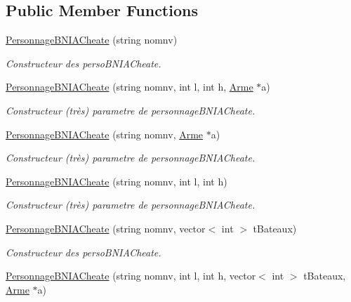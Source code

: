 \subsection*{Public Member Functions}
\begin{DoxyCompactItemize}
\item 
\hyperlink{classPersonnageBNIACheate_a5327d1825c6b7df29b288f4d5d872dd1}{Personnage\-B\-N\-I\-A\-Cheate} (string nomnv)
\begin{DoxyCompactList}\small\item\em Constructeur des perso\-B\-N\-I\-A\-Cheate. \end{DoxyCompactList}\item 
\hyperlink{classPersonnageBNIACheate_a0a05adafe445a5883a688d99b0315274}{Personnage\-B\-N\-I\-A\-Cheate} (string nomnv, int l, int h, \hyperlink{classArme}{Arme} $\ast$a)
\begin{DoxyCompactList}\small\item\em Constructeur (très) parametre de personnage\-B\-N\-I\-A\-Cheate. \end{DoxyCompactList}\item 
\hyperlink{classPersonnageBNIACheate_ad5dbf2b4b3bf76e1d354f3e0bbf70517}{Personnage\-B\-N\-I\-A\-Cheate} (string nomnv, \hyperlink{classArme}{Arme} $\ast$a)
\begin{DoxyCompactList}\small\item\em Constructeur (très) parametre de personnage\-B\-N\-I\-A\-Cheate. \end{DoxyCompactList}\item 
\hyperlink{classPersonnageBNIACheate_a9177e565be9865898cb3b57df2550676}{Personnage\-B\-N\-I\-A\-Cheate} (string nomnv, int l, int h)
\begin{DoxyCompactList}\small\item\em Constructeur (très) parametre de personnage\-B\-N\-I\-A\-Cheate. \end{DoxyCompactList}\item 
\hyperlink{classPersonnageBNIACheate_a5d2bfdd856359c8344613d61af0deda8}{Personnage\-B\-N\-I\-A\-Cheate} (string nomnv, vector$<$ int $>$ t\-Bateaux)
\begin{DoxyCompactList}\small\item\em Constructeur des perso\-B\-N\-I\-A\-Cheate. \end{DoxyCompactList}\item 
\hyperlink{classPersonnageBNIACheate_ae3d3529526e4f3b021f215d96f1d3114}{Personnage\-B\-N\-I\-A\-Cheate} (string nomnv, int l, int h, vector$<$ int $>$ t\-Bateaux, \hyperlink{classArme}{Arme} $\ast$a)

\end{DoxyCompactItemize}

